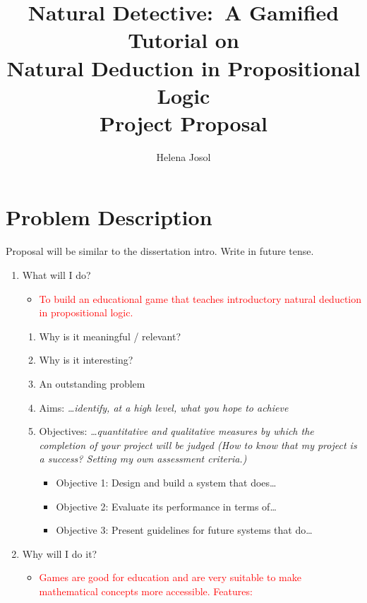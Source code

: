 \documentclass[a4paper,11pt]{article}
\title{Natural Detective:\ A Gamified Tutorial on \\ Natural Deduction in Propositional Logic \\ \medskip \Large{Project Proposal}}
\author{Helena Josol \autocite{adjl-blog}}
\date{}
\newcommand{\draft}[1]{\textcolor{red}{#1}} %
\begin{document}
\maketitle


\section{Problem Description} %
Proposal will be similar to the dissertation intro. Write in future tense.
\begin{enumerate}
  \item What will I do?
    \begin{itemize}
      \item \draft{To build an educational game that teaches introductory natural deduction in propositional logic.}
    \end{itemize}
    \begin{enumerate}
      \item Why is it meaningful / relevant?
      \item Why is it interesting?
      \item An outstanding problem
      \item Aims: \textit{\dots identify, at a high level, what you hope to achieve}
      \item Objectives: \textit{\dots quantitative and qualitative measures by which the completion of your project will be judged (How to know that my project is a success? Setting my own assessment criteria.)}
        \begin{itemize}
          \item Objective 1: Design and build a system that does\dots
          \item Objective 2: Evaluate its performance in terms of\dots
          \item Objective 3: Present guidelines for future systems that do\dots
        \end{itemize}
    \end{enumerate}
  \item Why will I do it?
    \begin{itemize}
      \item \draft{Games are good for education and are very suitable to make mathematical concepts more accessible. Features:}
      \begin{itemize}

\end{itemize}
\end{itemize}
\end{enumerate}
\end{document}
